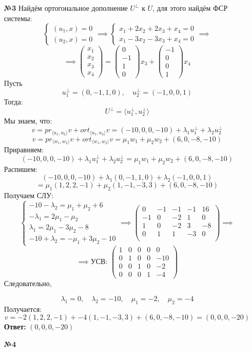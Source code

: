 \documentclass[a4paper]{article}
\newcommand{\mat}[1]{\begin{pmatrix} #1 \end{pmatrix}}
\newcommand{\case}[1]{\begin{cases} #1 \end{cases}}
\begin{document}
\begin{enumerate}
    \item[\textbf{№3}]Найдём ортогональное дополнение $U^\perp$ к $U$, для этого найдём ФСР системы:
    $$\case{
        (u_1, x) = 0\\
        (u_2, x) = 0
    } \implies \case{
        x_1+2x_2 + 2x_3 + x_4 = 0\\
        x_1-3x_2-3x_3 + x_4 = 0
    }\implies$$
    $$ \implies \mat{x_1\\x_2\\x_3\\x_4} = \mat{0\\-1\\1\\0}x_3 + \mat{-1\\0\\0\\1}x_4$$
    Пусть
    $$u_1^\perp = (0, -1, 1, 0), \quad u_2^\perp = (-1, 0, 0, 1)$$
    Тогда:
    $$U^\perp = \langle u_1^\perp, u_2^\perp \rangle$$
    Мы знаем, что:
    $$v = pr_{\langle u_1, u_2 \rangle} v  + ort_{\langle u_1, u_2 \rangle} v = 
     (-10, 0, 0, -10)  + \lambda_1 u_1^\perp + \lambda_2 u_2^\perp $$
    $$v = pr_{\langle w_1, w_2 \rangle} v  + ort_{\langle w_1, w_2 \rangle} v = 
     \mu_1 w_1 + \mu_2 w_2 + (6, 0, -8, -10)$$
    Приравняем:
    $$(-10, 0, 0, -10)  + \lambda_1 u_1^\perp + \lambda_2 u_2^\perp  = \mu_1 w_1 + \mu_2 w_2 + (6, 0, -8, -10)$$
    Распишем:
    $$(-10, 0, 0, -10)  + \lambda_1 (0, -1, 1, 0) + \lambda_2 (-1, 0, 0, 1)  $$
    $$= \mu_1(1, 2, 2, -1) + \mu_2 (1, -1, -3, 3) + (6, 0, -8, -10)$$
    Получаем СЛУ:
    $$\begin{cases}
        -10 - \lambda_2 = \mu_1 + \mu_2 + 6 \\
        -\lambda_1 = 2\mu_1 - \mu_2 \\
        \lambda_1 = 2\mu_1 - 3\mu_2 - 8 \\
        -10 + \lambda_2 = -\mu_1 + 3\mu_2 - 10
        \end{cases} \implies \begin{pmatrix}
            0 & -1 & -1 & -1 & 16 \\
            -1 & 0 & -2 & 1 & 0 \\
            1 & 0 & -2 & 3 & -8 \\
            0 & 1 & 1 & -3 & 0 \\
            \end{pmatrix} \implies$$
    $$\implies\text{УСВ: } 
    \begin{pmatrix}
        1 & 0 & 0 & 0 & 0 \\
        0 & 1 & 0 & 0 & -10 \\
        0 & 0 & 1 & 0 & -2 \\
        0 & 0 & 0 & 1 & -4
        \end{pmatrix}
    $$
    Следовательно,
    
    \[
    \lambda_1 = 0,\quad \lambda_2 = -10,\quad \mu_1 = -2,\quad \mu_2 = -4
    \]
    Получается:
    $$v = -2(1, 2, 2, -1) + -4 (1, -1, -3, 3) + (6, 0, -8, -10) = (0, 0, 0, -20)$$
    \textbf{Ответ: } $(0, 0, 0, -20)$


    \item[\textbf{№4}]
\end{enumerate}
\end{document}
